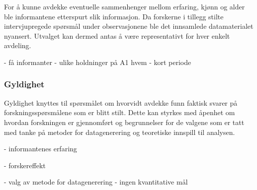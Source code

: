 \noindent
For å kunne avdekke eventuelle sammenhenger mellom erfaring, kjønn og alder ble informantene etterspurt slik informasjon. Da forskerne i tillegg stilte intervjupregede spørsmål under observasjonene ble det innsamlede datamaterialet nyansert. Utvalget kan dermed antas å være representativt for hver enkelt avdeling. 

- få informanter
	- ulike holdninger på A1
	 hvem
- kort periode 

\subsubsection{Gyldighet}
Gyldighet knyttes til spørsmålet om hvorvidt avdekke funn faktisk svarer på forskningsspørsmålene som er blitt stilt. Dette kan styrkes med åpenhet om hvordan forskningen er gjennomført og begrunnelser for de valgene som er tatt med tanke på metoder for datagenerering og teoretiske innspill til analysen. 

- informantenes erfaring

- forskereffekt

- valg av metode for datagenerering
	- ingen kvantitative mål